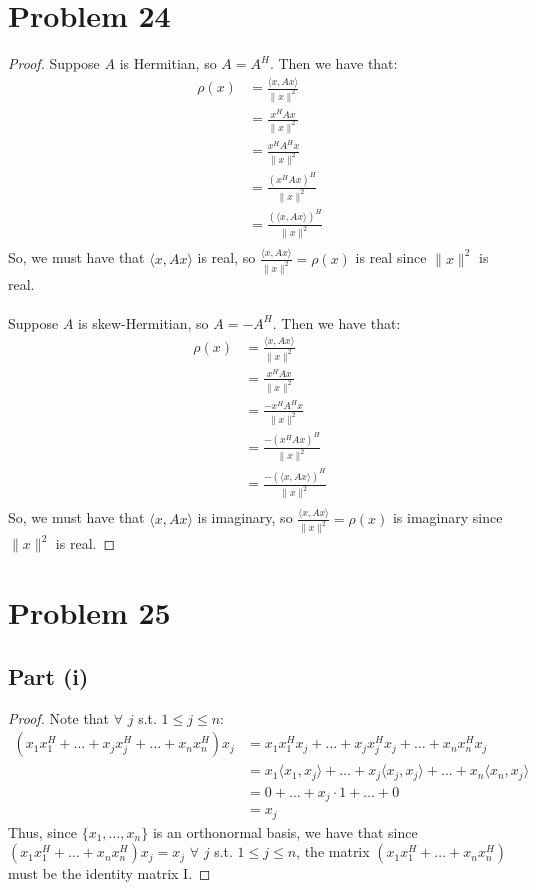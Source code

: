 \documentclass{article}
\begin{document}
\section*{Problem 24}

\begin{proof}
Suppose $A$ is Hermitian, so $A = A^{H}$. Then we have that:
\begin{align*}
\rho(x) &= \frac{\langle x, Ax \rangle}{\|x\|^2} \\
&= \frac{x^{H}Ax}{\|x\|^2} \\
&= \frac{x^{H}A^{H}x}{\|x\|^2} \\
&= \frac{(x^{H}Ax)^{H}}{\|x\|^2} \\
&= \frac{(\langle x, Ax \rangle)^{H}}{\|x\|^2} \\
\end{align*}
So, we must have that $\langle x, Ax \rangle$ is real, so $\frac{\langle x, Ax \rangle}{\|x\|^2} = \rho(x)$ is real since $\|x\|^2$ is real. \\
\\ 
Suppose $A$ is skew-Hermitian, so $A = -A^{H}$. Then we have that:
\begin{align*}
\rho(x) &= \frac{\langle x, Ax \rangle}{\|x\|^2} \\
&= \frac{x^{H}Ax}{\|x\|^2} \\
&= \frac{-x^{H}A^{H}x}{\|x\|^2} \\
&= \frac{-(x^{H}Ax)^{H}}{\|x\|^2} \\
&= \frac{-(\langle x, Ax \rangle)^{H}}{\|x\|^2} \\
\end{align*}
So, we must have that $\langle x, Ax \rangle$ is imaginary, so $\frac{\langle x, Ax \rangle}{\|x\|^2} = \rho(x)$ is imaginary since $\|x\|^2$ is real.
\end{proof}


\section*{Problem 25}

\subsection*{Part (i)}

\begin{proof}
Note that $\forall$ $j$ s.t. $1 \leq j \leq n$:
\begin{align*}
(x_{1}x_{1}^{H} + \dots + x_{j}x_{j}^{H} + \dots + x_{n}x_{n}^{H})x_j &= x_{1}x_{1}^{H}x_j + \dots + x_{j}x_{j}^{H}x_j + \dots + x_{n}x_{n}^{H}x_j \\
&= x_{1}\langle x_{1}, x_j \rangle + \dots + x_{j}\langle x_{j}, x_j \rangle + \dots + x_{n}\langle x_{n}, x_j \rangle \\
&= 0 + \dots + x_j \cdot 1 + \dots + 0 \\
&= x_j
\end{align*}
Thus, since $\{x_1, \dots, x_n\}$ is an orthonormal basis, we have that since $(x_{1}x_{1}^{H} + \dots + x_{n}x_{n}^{H})x_j = x_j$ $\forall$ $j$ s.t. $1 \leq j \leq n$, the matrix $(x_{1}x_{1}^{H} + \dots + x_{n}x_{n}^{H})$ must be the identity matrix I.
\end{proof}
\end{document}
